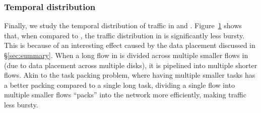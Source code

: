 
\subsubsection{Temporal distribution}
Finally, we study the temporal distribution of traffic in \dis and \pdis. Figure~\ref{fig:td} shows that, when compared to \pdis, the traffic distribution in \dis is significantly less bursty. This is because of an interesting effect caused by the data placement discussed in \S\ref{sec:summary}. When a long flow in \pdis is divided across multiple smaller flows in \dis (due to data placement across multiple disks), it is pipelined into multiple shorter flows. Akin to the task packing problem, where having multiple smaller tasks has a better packing compared to a single long task, dividing a single flow into multiple smaller flows ``packs'' into the network more efficiently, making traffic less bursty.
%
\begin{figure}
  \centering
  \caption{\small{}}
  \label{fig:td}
\end{figure}
%

